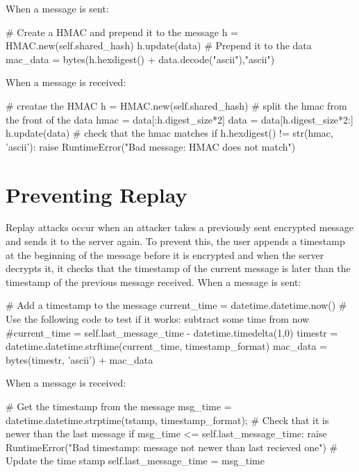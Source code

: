 \documentclass[9pt,a4paper]{article}
\begin{document}
When a message is sent:
\begin{center}
\vspace{-2ex}
\begin{python}
# Create a HMAC and prepend it to the message
h = HMAC.new(self.shared_hash)
h.update(data)
# Prepend it to the data
mac_data = bytes(h.hexdigest() + data.decode("ascii"),"ascii")
\end{python}\end{center}

When a message is received:
\begin{center}
\vspace{-2ex}
\begin{python}
# creatae the HMAC
h = HMAC.new(self.shared_hash)
# split the hmac from the front of the data
hmac = data[:h.digest_size*2]
data = data[h.digest_size*2:]
h.update(data)
# check that the hmac matches
if h.hexdigest() != str(hmac, 'ascii'):
    raise RuntimeError("Bad message: HMAC does not match")
\end{python}\end{center}

\section{Preventing Replay}
\vspace{-2ex}
Replay attacks occur when an attacker takes a previously sent encrypted message and sends it to the server again. To prevent this, the user appends a timestamp at the beginning of the message before it is encrypted and when the server decrypts it, it checks that the timestamp of the current message is later than the timestamp of the previous message received.
When a message is sent:
\begin{center}
\vspace{-2ex}
\begin{python}
# Add a timestamp to the message
current_time = datetime.datetime.now()
# Use the following code to test if it works: subtract some time from now
#current_time = self.last_message_time - datetime.timedelta(1,0)
timestr = datetime.datetime.strftime(current_time, timestamp_format)
mac_data = bytes(timestr, 'ascii') + mac_data
\end{python}\end{center}

When a message is received:
\begin{center}
\vspace{-2ex}
\begin{python}
# Get the timestamp from the message
msg_time = datetime.datetime.strptime(tstamp, timestamp_format);
# Check that it is newer than the last message
if msg_time <= self.last_message_time:
    raise RuntimeError("Bad timestamp: message not newer than last recieved one")
# Update the time stamp
self.last_message_time = msg_time
\end{python}\end{center}
\end{document}
